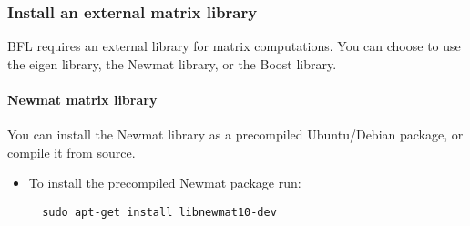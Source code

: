 \documentclass[a4paper,10pt]{article}
\begin{document}
\subsubsection{Install an external matrix library}
\label{subsec:matrix}
BFL requires an external library for matrix computations. You can
choose to use the eigen library, the Newmat library, or the Boost library.

\paragraph{Newmat matrix library}
You can install the Newmat library as a precompiled Ubuntu/Debian
package, or compile it from source.
\begin{itemize}
\item To install the precompiled Newmat package run:
\begin{verbatim}
  sudo apt-get install libnewmat10-dev
\end{verbatim}



\end{itemize}
\end{document}
